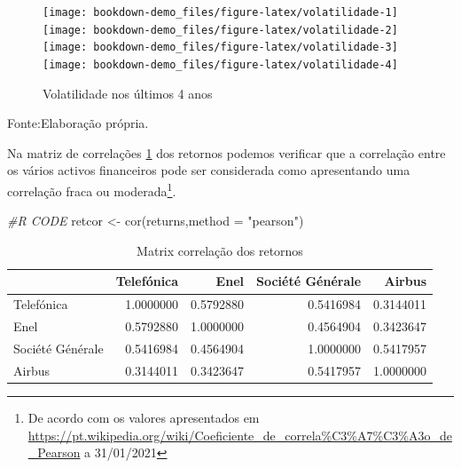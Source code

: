 \documentclass[
  12pt,
  a4paper,
  openany]{book}
\newenvironment{Shaded}{\begin{snugshade}}{\end{snugshade}}
\newcommand{\AttributeTok}[1]{\textcolor[rgb]{0.77,0.63,0.00}{#1}}
\newcommand{\CommentTok}[1]{\textcolor[rgb]{0.56,0.35,0.01}{\textit{#1}}}
\newcommand{\FunctionTok}[1]{\textcolor[rgb]{0.00,0.00,0.00}{#1}}
\newcommand{\NormalTok}[1]{#1}
\newcommand{\OtherTok}[1]{\textcolor[rgb]{0.56,0.35,0.01}{#1}}
\newcommand{\StringTok}[1]{\textcolor[rgb]{0.31,0.60,0.02}{#1}}
\theoremstyle{definition}
\theoremstyle{definition}
\theoremstyle{definition}
\theoremstyle{remark}
\begin{document}
\normalsize

\begin{figure}

{\centering \texttt{[image: bookdown-demo\_files/figure-latex/volatilidade-1]} \texttt{[image: bookdown-demo\_files/figure-latex/volatilidade-2]} \texttt{[image: bookdown-demo\_files/figure-latex/volatilidade-3]} \texttt{[image: bookdown-demo\_files/figure-latex/volatilidade-4]} 

}

\caption{Volatilidade nos últimos 4 anos}\label{fig:volatilidade}
\end{figure}
\FloatBarrier
\centering

Fonte:Elaboração própria.

\justifying
\bigskip

Na matriz de correlações \ref{tab:correl} dos retornos podemos verificar que a correlação entre os vários activos financeiros pode ser considerada como apresentando uma correlação fraca ou moderada\footnote{De acordo com os valores apresentados em \url{https://pt.wikipedia.org/wiki/Coeficiente_de_correla\%C3\%A7\%C3\%A3o_de_Pearson} a 31/01/2021}.

\scriptsize

\begin{Shaded}
\begin{Highlighting}[]
\CommentTok{\#R CODE}
\NormalTok{retcor }\OtherTok{\textless{}{-}} \FunctionTok{cor}\NormalTok{(returns,}\AttributeTok{method =} \StringTok{"pearson"}\NormalTok{)}
\end{Highlighting}
\end{Shaded}

\normalsize

\begin{table}[!h]

\caption{\label{tab:correl}Matrix correlação dos retornos}
\centering
\begin{tabular}[t]{lrrrr}
\toprule
  & Telefónica & Enel & Société Générale  & Airbus\\
\midrule
Telefónica & 1.0000000 & 0.5792880 & 0.5416984 & 0.3144011\\
Enel & 0.5792880 & 1.0000000 & 0.4564904 & 0.3423647\\
Société Générale & 0.5416984 & 0.4564904 & 1.0000000 & 0.5417957\\
Airbus & 0.3144011 & 0.3423647 & 0.5417957 & 1.0000000\\
\bottomrule
\end{tabular}
\end{table}
\FloatBarrier
\centering
\end{document}
